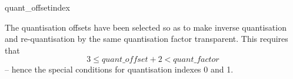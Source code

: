 \begin{pseudo}{quant\_offset}{index}
\bsELSE
    \bsELSE
    \bsEND
  \bsELSE
  \bsEND
\bsEND
{}
\end{pseudo}

\begin{informative}
The quantisation offsets have been selected so as to make inverse quantisation
and re-quantisation by the same quantisation factor transparent. This requires that
\[3\leq quant\_offset+2<quant\_factor\] -- hence the special conditions for 
quantisation indexes 0 and 1.
\end{informative}
